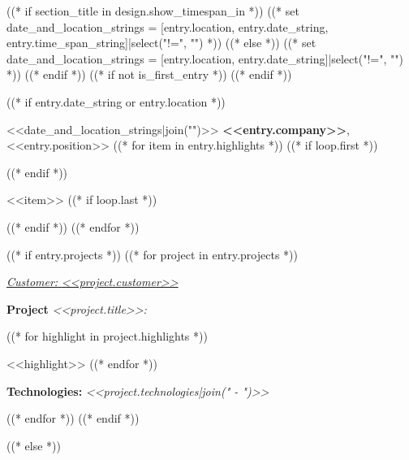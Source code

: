 ((* if section_title in design.show_timespan_in *))
    ((* set date_and_location_strings = [entry.location, entry.date_string, entry.time_span_string]|select("!=", "") *))
((* else *))
    ((* set date_and_location_strings = [entry.location, entry.date_string]|select("!=", "") *))
((* endif *))
((* if not is_first_entry *))
\vspace{<<design.margins.entry_area.vertical_between>>}
((* endif *))

((* if entry.date_string or entry.location *))
\begin{twocolentry}{
    <<date_and_location_strings|join("\n\n")>>
}
    \textcolor{secondaryColor}{\faBriefcase\hspace{4pt}\textbf{<<entry.company>>},} <<entry.position>>
    ((* for item in entry.highlights *))
        ((* if loop.first *))
    \begin{highlights}
        ((* endif *))
        \item <<item>>
        ((* if loop.last *))
    \end{highlights}
        ((* endif *))
    ((* endfor *))

    ((* if entry.projects *))
    \vspace{<<design.margins.projects_area.vertical_between_projects>>}
    ((* for project in entry.projects *))
        \vspace{<<design.margins.projects_area.vertical_between_projects>>}

        \textcolor{tertiaryColor}{\faAngleDoubleRight\hspace{0.1cm}\underline{\textit{Customer:} \textit{<<project.customer>>}}}

        \vspace{0.2cm}
        \textbf{Project \faAngleRight} \textit{<<project.title>>:}

        \begin{highlights}
            ((* for highlight in project.highlights *))
                \item <<highlight>>
            ((* endfor *))
        \end{highlights}
        \faBuffer
        \textbf{ Technologies:} \textit{<<project.technologies|join(" - ")>>}

        \vspace{<<design.margins.projects_area.vertical_between_projects>>}

    ((* endfor *))
    ((* endif *))
\end{twocolentry}
((* else *))
